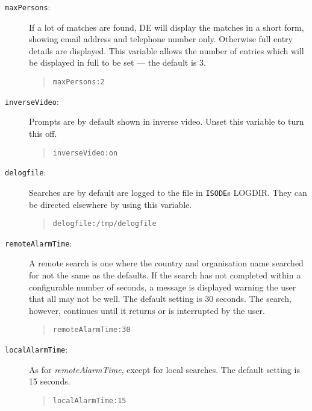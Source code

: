 \begin{description}

\item [\verb+maxPersons+:]  If a lot of matches are found, DE will display the
matches in a short form, showing email address and telephone number only.
Otherwise full entry details are displayed.  This variable allows the number
of entries which will be displayed in full to be set --- the default is 3.

\begin{quote}\small\begin{verbatim}
maxPersons:2
\end{verbatim}\end{quote}

\item [\verb+inverseVideo+:]  Prompts are by default shown in inverse video.  Unset
this variable to turn this off.

\begin{quote}\small\begin{verbatim}
inverseVideo:on
\end{verbatim}\end{quote}

\item [\verb+delogfile+:]  Searches are by default are logged to the file
in \verb+ISODE+s LOGDIR.  They can be directed elsewhere by using this
variable.

\begin{quote}\small\begin{verbatim}
delogfile:/tmp/delogfile
\end{verbatim}\end{quote}

\item [\verb+remoteAlarmTime+:]  A remote search is one where
the country and organisation name searched for not the same as
the defaults.  If the search has not completed within a configurable number
of seconds, a message is displayed warning the user that all may not be well.
The default setting is 30 seconds.
The search, however, continues until it returns or is interrupted by the
user.

\begin{quote}\small\begin{verbatim}
remoteAlarmTime:30
\end{verbatim}\end{quote}

\item [\verb+localAlarmTime+:]  As for {\em remoteAlarmTime}, except for local searches.
The default setting is 15 seconds.

\begin{quote}\small\begin{verbatim}
localAlarmTime:15
\end{verbatim}\end{quote}

\end{description}
